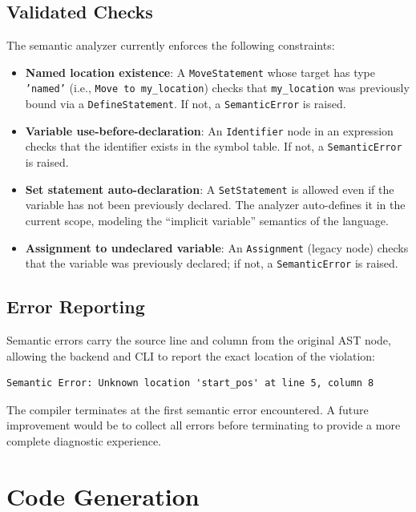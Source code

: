 \subsection*{Validated Checks}

The semantic analyzer currently enforces the following constraints:

\begin{itemize}
    \item[-] \textbf{Named location existence}: A \texttt{MoveStatement} whose target has type \texttt{'named'} (i.e., \texttt{Move to my\_location}) checks that \texttt{my\_location} was previously bound via a \texttt{DefineStatement}. If not, a \texttt{SemanticError} is raised.
    \item[-] \textbf{Variable use-before-declaration}: An \texttt{Identifier} node in an expression checks that the identifier exists in the symbol table. If not, a \texttt{SemanticError} is raised.
    \item[-] \textbf{Set statement auto-declaration}: A \texttt{SetStatement} is allowed even if the variable has not been previously declared. The analyzer auto-defines it in the current scope, modeling the ``implicit variable'' semantics of the language.
    \item[-] \textbf{Assignment to undeclared variable}: An \texttt{Assignment} (legacy node) checks that the variable was previously declared; if not, a \texttt{SemanticError} is raised.
\end{itemize}

\subsection*{Error Reporting}

Semantic errors carry the source line and column from the original AST node, allowing the backend and CLI to report the exact location of the violation:

\begin{verbatim}
Semantic Error: Unknown location 'start_pos' at line 5, column 8
\end{verbatim}

The compiler terminates at the first semantic error encountered. A future improvement would be to collect all errors before terminating to provide a more complete diagnostic experience.

\section{Code Generation}

